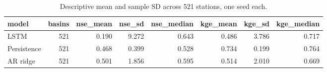 \begin{table}[tb]
\caption{Descriptive mean and sample SD across 521 stations, one seed each.}
\label{tab:global-lstm}
\begin{tabular}{lrrrrrrr}
\toprule
model & basins & nse_mean & nse_sd & nse_median & kge_mean & kge_sd & kge_median \\
\midrule
LSTM & 521 & 0.190 & 9.272 & 0.643 & 0.486 & 3.786 & 0.717 \\
Persistence & 521 & 0.468 & 0.399 & 0.528 & 0.734 & 0.199 & 0.764 \\
AR ridge & 521 & 0.501 & 1.856 & 0.595 & 0.514 & 2.010 & 0.669 \\
\bottomrule
\end{tabular}
\end{table}
